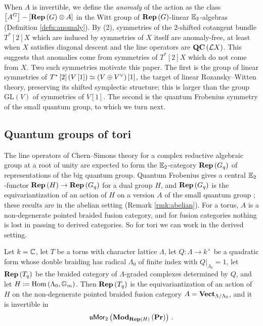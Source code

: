 When $A$ is invertible, we define the \emph{anomaly} of the action as the class
$\left[A^G\right]-\left[\mathbf{Rep}\left(G\right)\otimes A\right]$ in the Witt group of
$\mathbf{Rep}\left(G\right)$-linear $\mathbb{E}_2$-algebras (Definition \ref{defn:anomaly}). 
By (2), symmetries of the $2$-shifted cotangent bundle $T^*\left[2\right]X$ which are induced
by symmetries of $X$ itself are anomaly-free, at least when $X$ satisfies diagonal descent and
the line operators are $\mathbf{QC}\left(\mathcal{L} X\right)$. This suggests that anomalies come from
symmetries of $T^*\left[2\right]X$ which do not come from $X$.
Two such symmetries motivate this paper. The first is the group of linear symmetries of
$T^*\left[2\right]\left(V\left[1\right]\right)\simeq\left(V\oplus V^\vee\right)\left[1\right]$, the
target of linear Rozansky--Witten theory, preserving its shifted symplectic structure; this is
larger than the group $\mathrm{GL}\left(V\right)$ of symmetries of $V\left[1\right]$.
The second is the quantum Frobenius symmetry of the small quantum group, to which we turn
next.

\subsection*{Quantum groups of tori}
\label{sec:intro_CS}

The line operators of Chern--Simons theory for a complex reductive algebraic group at a
root of unity are expected to form the $\mathbb{E}_2$-category $\mathbf{Rep}\left(G_q\right)$ of
representations of the big quantum group.
Quantum Frobenius gives a central $\mathbb{E}_2$-functor $\mathbf{Rep}\left(H\right)\to\mathbf{Rep}\left(G_q\right)$
for a dual group $H$, and $\mathbf{Rep}\left(G_q\right)$ is the equivariantization of an action of
$H$ on a version $A$ of the small quantum group \cite{AG:small, Neg:frob, Neg:log}; these
results are in the abelian setting (Remark \ref{rmk:abelian}).
For a torus, $A$ is a non-degenerate pointed braided fusion category, and for fusion categories
nothing is lost in passing to derived categories. So for tori we can work in the derived setting.

\begin{introthm}
\label{thm:intro_C}
Let $k=\mathbb{C}$, let $T$ be a torus with character lattice $\Lambda$, let $Q\colon\Lambda\to k^\times$ be a quadratic
form whose double braiding has radical $\Lambda_0$ of finite index with $Q|_{\Lambda_0}=1$, let
$\mathbf{Rep}\left(T_q\right)$ be the braided category of $\Lambda$-graded complexes determined by $Q$, and let
$H\coloneqq\operatorname{Hom}\left(\Lambda_0,\mathbb{G}_m\right)$. Then $\mathbf{Rep}\left(T_q\right)$ is the equivariantization of
an action of $H$ on the non-degenerate pointed braided fusion category $A=\mathbf{Vect}_{\Lambda/\Lambda_0}$,
and it is invertible in
\begin{equation*}
\mathfrak{u}\mathsf{Mor}_2\left(\mathbf{Mod}_{\mathbf{Rep}\left(H\right)}\left(\mathbf{Pr}\right)\right) \, .
\end{equation*}
\end{introthm}

